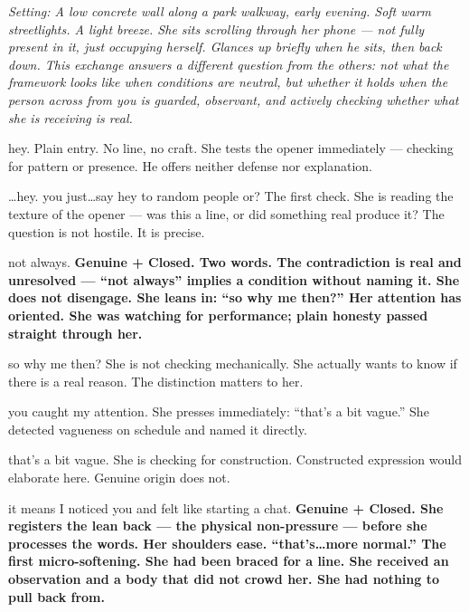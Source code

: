 \textit{Setting: A low concrete wall along a park walkway, early evening. 
Soft warm streetlights. A light breeze. She sits scrolling through her phone --- 
not fully present in it, just occupying herself. Glances up briefly when he sits, 
then back down. This exchange answers a different question from the others: 
not what the framework looks like when conditions are neutral, but whether it 
holds when the person across from you is guarded, observant, and actively 
checking whether what she is receiving is real.}

\goldrule

{hey.}
{Plain entry. No line, no craft. She tests the opener immediately --- 
checking for pattern or presence. He offers neither defense nor explanation.}

{\ldots hey. you just\ldots say hey to random people or?}
{The first check. She is reading the texture of the opener --- 
was this a line, or did something real produce it? The question is not hostile. 
It is precise.}

\thinrule

{not always.}
{\textbf{Genuine + Closed. Two words. The contradiction is real and unresolved --- 
``not always'' implies a condition without naming it. She does not disengage. 
She leans in: ``so why me then?'' Her attention has oriented. 
She was watching for performance; plain honesty passed straight through her.}}

{so why me then?}
{She is not checking mechanically. She actually wants to know if there is a real 
reason. The distinction matters to her.}

\thinrule

{you caught my attention.}
{She presses immediately: ``that's a bit vague.'' She detected vagueness on 
schedule and named it directly.}

{that's a bit vague.}
{She is checking for construction. Constructed expression would elaborate here. 
Genuine origin does not.}

\thinrule

{it means I noticed you and felt like starting a chat.}
{\textbf{Genuine + Closed. She registers the lean back --- the physical 
non-pressure --- before she processes the words. Her shoulders ease. 
``that's\ldots more normal.'' The first micro-softening. She had been braced 
for a line. She received an observation and a body that did not crowd her. 
She had nothing to pull back from.}}

